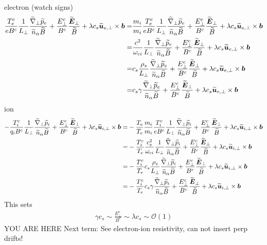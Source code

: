 %
electron (watch signs)
%
\begin{align*}
    \frac{T^c_e}{e B^c}
\frac{1}{L_{\perp}}
\frac{ \widetilde{ \nabla}_\perp \widetilde{ p}_e }{\widetilde{ n}_\alpha \widetilde{ B}}
+ \frac{E_\perp^c}{B^c}
\frac{\widetilde{ \boldsymbol{E}}_\perp}{\widetilde{ B}}
+ \lambda c_s
\widetilde{ \boldsymbol{u}}_{e,\perp}\times\boldsymbol{b}
=&
\frac{m_i}{m_i}
\frac{T^c_e}{e B^c}
\frac{1}{L_{\perp}}
\frac{ \widetilde{ \nabla}_\perp \widetilde{ p}_e }{\widetilde{ n}_\alpha \widetilde{ B}}
+ \frac{E_\perp^c}{B^c}
\frac{\widetilde{ \boldsymbol{E}}_\perp}{\widetilde{ B}}
+ \lambda c_s
\widetilde{ \boldsymbol{u}}_{e,\perp}\times\boldsymbol{b}
\\
=&
\frac{c^2}{\omega_{ci}}
\frac{1}{L_{\perp}}
\frac{ \widetilde{ \nabla}_\perp \widetilde{ p}_e }{\widetilde{ n}_\alpha \widetilde{ B}}
+ \frac{E_\perp^c}{B^c}
\frac{\widetilde{ \boldsymbol{E}}_\perp}{\widetilde{ B}}
+ \lambda c_s
\widetilde{ \boldsymbol{u}}_{e,\perp}\times\boldsymbol{b}
\\
=&
c_s
\frac{\rho_s}{L_{\perp}}
\frac{ \widetilde{ \nabla}_\perp \widetilde{ p}_e }{\widetilde{ n}_\alpha \widetilde{ B}}
+ \frac{E_\perp^c}{B^c}
\frac{\widetilde{ \boldsymbol{E}}_\perp}{\widetilde{ B}}
+ \lambda c_s
\widetilde{ \boldsymbol{u}}_{e,\perp}\times\boldsymbol{b}
\\
=&
c_s
\gamma
\frac{ \widetilde{ \nabla}_\perp \widetilde{ p}_e }{\widetilde{ n}_\alpha \widetilde{ B}}
+ \frac{E_\perp^c}{B^c}
\frac{\widetilde{ \boldsymbol{E}}_\perp}{\widetilde{ B}}
+ \lambda c_s
\widetilde{ \boldsymbol{u}}_{e,\perp}\times\boldsymbol{b}
\end{align*}
%
ion
%
\begin{align*}
    - \frac{T^c_i}{q_i B^c}
\frac{1}{L_{\perp}}
\frac{ \widetilde{ \nabla}_\perp \widetilde{ p}_i }{\widetilde{ n}_\alpha \widetilde{ B}}
+ \frac{E_\perp^c}{B^c}
\frac{\widetilde{ \boldsymbol{E}}_\perp}{\widetilde{ B}}
+ \lambda c_s
\widetilde{ \boldsymbol{u}}_{i,\perp}\times\boldsymbol{b}
=&
- \frac{T_e}{T_e}
\frac{m_i}{m_i}
\frac{T^c_i}{e B^c}
\frac{1}{L_{\perp}}
\frac{ \widetilde{ \nabla}_\perp \widetilde{ p}_i }{\widetilde{ n}_\alpha \widetilde{ B}}
+ \frac{E_\perp^c}{B^c}
\frac{\widetilde{ \boldsymbol{E}}_\perp}{\widetilde{ B}}
+ \lambda c_s
\widetilde{ \boldsymbol{u}}_{i,\perp}\times\boldsymbol{b}
\\
=&
- \frac{T^c_i}{T_e}
\frac{c_s^2}{\omega_{ci}}
\frac{1}{L_{\perp}}
\frac{ \widetilde{ \nabla}_\perp \widetilde{ p}_i }{\widetilde{ n}_\alpha \widetilde{ B}}
+ \frac{E_\perp^c}{B^c}
\frac{\widetilde{ \boldsymbol{E}}_\perp}{\widetilde{ B}}
+ \lambda c_s
\widetilde{ \boldsymbol{u}}_{i,\perp}\times\boldsymbol{b}
\\
=&
- \frac{T^c_i}{T_e}
c_s
\frac{\rho_s}{L_{\perp}}
\frac{ \widetilde{ \nabla}_\perp \widetilde{ p}_i }{\widetilde{ n}_\alpha \widetilde{ B}}
+ \frac{E_\perp^c}{B^c}
\frac{\widetilde{ \boldsymbol{E}}_\perp}{\widetilde{ B}}
+ \lambda c_s
\widetilde{ \boldsymbol{u}}_{i,\perp}\times\boldsymbol{b}
\\
=&
- \frac{T^c_i}{T_e}
c_s
\gamma
\frac{ \widetilde{ \nabla}_\perp \widetilde{ p}_i }{\widetilde{ n}_\alpha \widetilde{ B}}
+ \frac{E_\perp^c}{B^c}
\frac{\widetilde{ \boldsymbol{E}}_\perp}{\widetilde{ B}}
+ \lambda c_s
\widetilde{ \boldsymbol{u}}_{i,\perp}\times\boldsymbol{b}
\end{align*}
%
This sets
%
\begin{align*}
    \gamma c_s \sim \frac{E_\perp^c}{B^c} \sim \lambda c_s \sim \mathcal{O}(1)
\end{align*}
%
YOU ARE HERE
%
Next term: See electron-ion resistivity, can not insert perp drifts!

